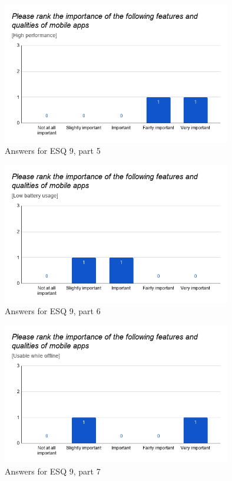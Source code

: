 \documentclass[a4paper,12pt]{article}
\begin{document}
\begin{figure}[ht!]
    \centering
    \includegraphics[width=10cm]{img/Results/esq9_5.png}
    \caption{Answers for ESQ 9, part 5}
    \label{fig:res_eduq9_5}
\end{figure}

\begin{figure}[ht!]
    \centering
    \includegraphics[width=10cm]{img/Results/esq9_6.png}
    \caption{Answers for ESQ 9, part 6}
    \label{fig:res_eduq9_6}
\end{figure}

\begin{figure}[ht!]
    \centering
    \includegraphics[width=10cm]{img/Results/esq9_7.png}
    \caption{Answers for ESQ 9, part 7}
    \label{fig:res_eduq9_7}
\end{figure}
\end{document}

